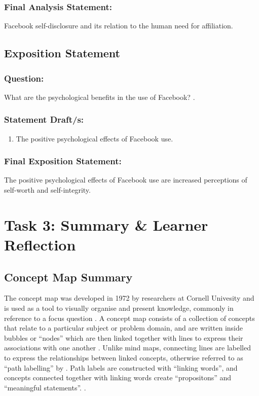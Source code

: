 \documentclass[12pt,a4paper]{report}
\begin{document}
\subsubsection*{\textsf{Final Analysis Statement:}}
Facebook self-disclosure and its relation to the human need for affiliation.

\subsection*{\textsf{Exposition Statement}}

\subsubsection*{\textsf{Question:}}
What are the psychological benefits in the use of Facebook? \citep{Toma2013}.

\subsubsection*{\textsf{Statement Draft/s:}}
\begin{enumerate}
\item The positive psychological effects of Facebook use.
\end{enumerate}

\subsubsection*{\textsf{Final Exposition Statement:}}
The positive psychological effects of Facebook use are increased perceptions of self-worth and self-integrity.

\newpage
\section*{\textsf{Task 3: Summary \& Learner Reflection}}

\subsection*{\textsf{Concept Map Summary}}

The concept map was developed in 1972 by researchers at Cornell Univesity and is used as a tool to visually organise and present knowledge, commonly in reference to a focus question \citep{Novak2006}. A concept map consists of a collection of concepts that relate to a particular subject or problem domain, and are written inside bubbles or ``nodes'' which are then linked together with lines to express their associations with one another \citep{Novak2006}. Unlike mind maps, connecting lines are labelled to express the relationships between linked concepts, otherwise referred to as ``path labelling'' by \citet[pp. 790]{Rodriguez-Priego2013}. Path labels are constructed with ``linking words'', and concepts connected together with linking words create ``propositons'' and ``meaningful statements''. \citep[pp. 1]{Novak2006}.\\
\end{document}
